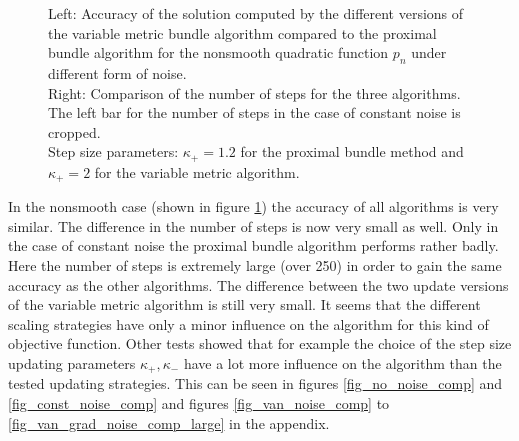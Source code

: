 \begin{figure}[ht]
	\begin{subfigure}[t]{0.49\textwidth}
	\end{subfigure}
	\begin{subfigure}[t]{0.49\textwidth}
	\end{subfigure}
	\caption[Accuracy and number of steps for a nonsmooth quadratic]{Left: Accuracy of the solution computed by the different versions of the variable metric bundle algorithm compared to the proximal bundle algorithm for the nonsmooth quadratic function \(p_n\) under different form of noise.\\
	Right: Comparison of the number of steps for the three algorithms. The left bar for the number of steps in the case of constant noise is cropped.\\
	Step size parameters: \(\kappa_+ = 1.2\) for the proximal bundle method and \(\kappa_+ = 2\) for the variable metric algorithm.}
	\label{fig_bar_nonsm_parab}
\end{figure}

In the nonsmooth case (shown in figure \ref{fig_bar_nonsm_parab}) the accuracy of all algorithms is very similar. The difference in the number of steps is now very small as well.
Only in the case of constant noise the proximal bundle algorithm performs rather badly. Here the number of steps is extremely large (over 250) in order to gain the same accuracy as the other algorithms.
The difference between the two update versions of the variable metric algorithm is still very small. It seems that the different scaling strategies have only a minor influence on the algorithm for this kind of objective function. Other tests showed that for example the choice of the step size updating parameters \(\kappa_+, \kappa_-\) have a lot more influence on the algorithm than the tested updating strategies. This can be seen in figures \ref{fig_no_noise_comp}  and \ref{fig_const_noise_comp} and figures \ref{fig_van_noise_comp} to \ref{fig_van_grad_noise_comp_large} in the appendix.



